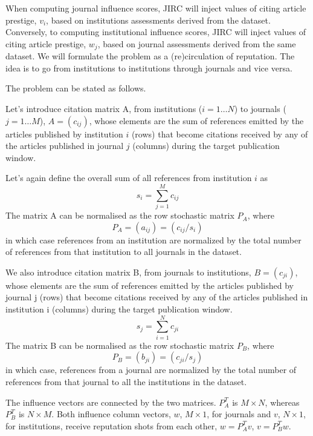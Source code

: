 \documentclass[10pt]{article}
\begin{document}
When computing journal influence scores, JIRC will inject  values of citing article prestige, $v_i$, based on institutions assessments derived from the  dataset. Conversely, to
 computing institutional influence scores, JIRC will inject  values of citing article prestige, $w_j$, based on journal assessments derived from the same dataset.
We will formulate the problem as a (re)circulation of reputation. The idea is to go from institutions to institutions through journals and vice versa.

\noindent The problem can be stated as follows.

Let's introduce  citation matrix A, from institutions ($i=1\ldots N$) to journals ($j=1\ldots M$), $A = (c_{ij})$,  whose elements are the sum of references emitted by
the articles published by institution $i$ (rows) that become citations received by any of the articles published in journal $j$ (columns) during the target
publication window.

\noindent Let's again define the overall sum of all references from institution $i$ as
\begin{equation}
s_i = \sum_{j=1}^Mc_{ij}
\end{equation}
The matrix A can be normalised as the row stochastic matrix $P_A$, where
\begin{equation}
P_A = (a_{ij}) = (c_{ij}/s_i)
\label{pa}
\end{equation}
in which case references from an institution are normalized by the total number of references from that institution to all journals in the dataset.


We also  introduce  citation matrix B, from journals  to institutions, $B = (c_{ji})$,  whose elements are the sum of references emitted by
the articles published by journal j (rows) that become citations received by any of the articles published in institution i (columns) during the target
publication window.
\begin{equation}
s_j = \sum_{i=1}^Nc_{ji}
\end{equation}
The matrix B can be normalised as the row stochastic matrix $P_B$, where
\begin{equation}
P_B = (b_{ji}) = (c_{ji}/s_j)
\label{pb}
\end{equation}
in which case, references from a journal are normalized by the total number of references from that journal to all the institutions in the dataset.



The influence vectors are connected by the two matrices. $P_A^T$ is $M\times N$, whereas $P_B^T$ is $N\times M$. Both influence column vectors, $w$, $M\times1$, for journals and $v$, $N\times1$, for institutions, receive reputation shots from each other, $w=P_A^Tv$, $v=P_B^Tw$.
\end{document}
